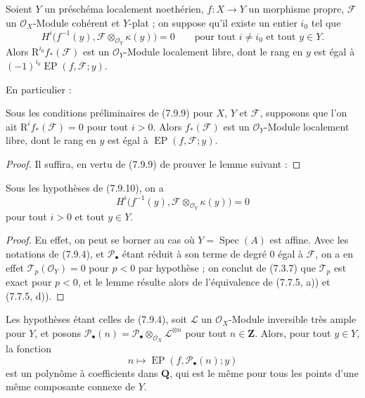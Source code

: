 \begin{corollary}[7.9.9]
\label{III.7.9.9.fr}
Soient $Y$ un préschéma localement noethérien, $f:X\to Y$ un morphisme propre,
$\mathscr F$ un $\mathscr O_X$-Module cohérent et $Y$-plat ; on suppose qu'il
existe un entier $i_0$ tel que
\[
  H^i\bigl(f^{-1}(y),
  \mathscr F\otimes_{\mathscr O_Y}\kappa(y)\bigr)=0
  \qquad\text{pour tout $i\ne i_0$ et tout $y\in Y$.}
\]
Alors $\mathrm R^{i_0}f_*(\mathscr F)$ est un $\mathscr O_Y$-Module localement
libre, dont le rang en $y$ est égal à
$(-1)^{i_0}\operatorname{EP}(f,\mathscr F;y)$.
\end{corollary}

En particulier :

\begin{corollary}[7.9.10]
\label{III.7.9.10.fr}
Sous les conditions préliminaires de (7.9.9) pour $X$, $Y$ et $\mathscr F$,
supposons que l'on ait $\mathrm R^if_*(\mathscr F)=0$ pour tout $i>0$. Alors
$f_*(\mathscr F)$ est un $\mathscr O_Y$-Module localement libre, dont le rang en
$y$ est égal à $\operatorname{EP}(f,\mathscr F;y)$.
\end{corollary}

\begin{proof}
Il suffira, en vertu de (7.9.9) de prouver le lemme suivant :
\end{proof}

\begin{lemma}[7.9.10.1]
\label{III.7.9.10.1.fr}
Sous les hypothèses de (7.9.10), on a
\[
  H^i\bigl(f^{-1}(y),
  \mathscr F\otimes_{\mathscr O_Y}\kappa(y)\bigr)=0
\]
pour tout $i>0$ et tout $y\in Y$.
\end{lemma}

\begin{proof}
En effet, on peut se borner au cas où $Y=\operatorname{Spec}(A)$ est affine.
Avec les notations de (7.9.4), et $\mathscr P_\bullet$ étant réduit à son terme
de degré $0$ égal à $\mathscr F$, on a en effet
$\mathscr T_p(\mathscr O_Y)=0$ pour $p<0$ par hypothèse ; on conclut de (7.3.7)
que $\mathscr T_p$ est exact pour $p<0$, et le lemme résulte alors de
l'équivalence de (7.7.5, a)) et (7.7.5, d)).
\end{proof}

\begin{proposition}[7.9.11]
\label{III.7.9.11.fr}
Les hypothèses étant celles de (7.9.4), soit $\mathscr L$ un
$\mathscr O_X$-Module inversible très ample pour $Y$, et posons
$\mathscr P_\bullet(n)=\mathscr P_\bullet\otimes_{\mathscr O_X}
\mathscr L^{\otimes n}$ pour tout $n\in\mathbf Z$. Alors, pour tout $y\in Y$,
la fonction
\[
  n\longmapsto\operatorname{EP}(f,\mathscr P_\bullet(n);y)
  \tag{7.9.11.1}\label{III.7.9.11.1.fr}
\]
est un polynôme à coefficients dans $\mathbf Q$, qui est le même pour tous les
points d'une même composante connexe de $Y$.
\end{proposition}

